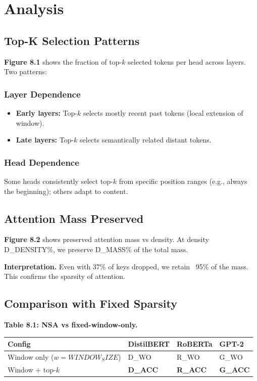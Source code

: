 
\section{Analysis}

\subsection{Top-K Selection Patterns}

\textbf{Figure 8.1} shows the fraction of top-$k$ selected tokens per head across 
layers. Two patterns:

\subsubsection{Layer Dependence}

\begin{itemize}
\item \textbf{Early layers:} Top-$k$ selects mostly recent past tokens (local
  extension of window).
\item \textbf{Late layers:} Top-$k$ selects semantically related distant tokens.

\end{itemize}
\subsubsection{Head Dependence}

Some heads consistently select top-$k$ from specific position ranges (e.g., 
always the beginning); others adapt to content.

\subsection{Attention Mass Preserved}

\textbf{Figure 8.2} shows preserved attention mass vs density. At density 
{{D\_DENSITY}}\%, we preserve {{D\_MASS}}\% of the total mass.

\textbf{Interpretation.} Even with 37\% of keys dropped, we retain ~95\% of the 
mass. This confirms the sparsity of attention.

\subsection{Comparison with Fixed Sparsity}

\textbf{Table 8.1: NSA vs fixed-window-only.}

\begin{table}[H]
\centering
\small
\begin{tabular}{llll}
\toprule
\textbf{Config} & \textbf{DistilBERT} & \textbf{RoBERTa} & \textbf{GPT-2} \\
\midrule
Window only ($w={WINDOW_SIZE}$) & {{D\_WO}} & {{R\_WO}} & {{G\_WO}} \\
Window + top-$k$ & \textbf{{{D\_ACC}}} & \textbf{{{R\_ACC}}} & \textbf{{{G\_ACC}}} \\
\bottomrule
\end{tabular}
\end{table}

